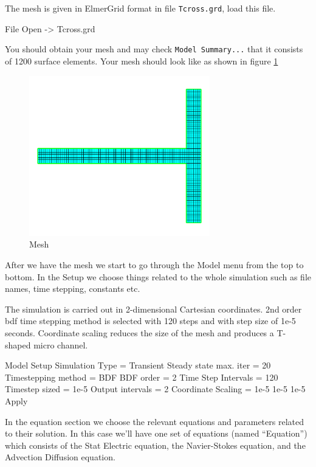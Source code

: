 The mesh is given in ElmerGrid format in file \texttt{Tcross.grd}, load this file.

\ttbegin
File 
  Open -> Tcross.grd
\ttend

You should obtain your mesh and may check \texttt{Model Summary...} that it consists of 1200 surface elements.  Your mesh should look like as shown in figure \ref{fg:mesh}

\begin{figure}[H]
\centering
\includegraphics[width=0.7\textwidth]{mesh}
\caption{Mesh}\label{fg:mesh}
\end{figure}

After we have the mesh we start to go through the Model menu from the top to bottom.  In the Setup we choose things related to the whole simulation such as file names, time stepping, constants etc.  

The simulation is carried out in 2-dimensional Cartesian coordinates.  2nd order bdf time stepping method is selected with 120 steps and with step size of 1e-5 seconds.  Coordinate scaling reduces the size of the mesh and produces a T-shaped micro channel.


\ttbegin
Model
  Setup 
    Simulation Type = Transient
    Steady state max. iter = 20
    Timestepping method = BDF
    BDF order = 2
    Time Step Intervals = 120
    Timestep sized = 1e-5
    Output intervals = 2
    Coordinate Scaling = 1e-5 1e-5 1e-5
  Apply
\ttend

In the equation section we choose the relevant equations and parameters related to their solution.  In this case we'll have one set of equations (named ``Equation'') which consists of the Stat Electric equation, the Navier-Stokes equation, and the Advection Diffusion equation.\\

